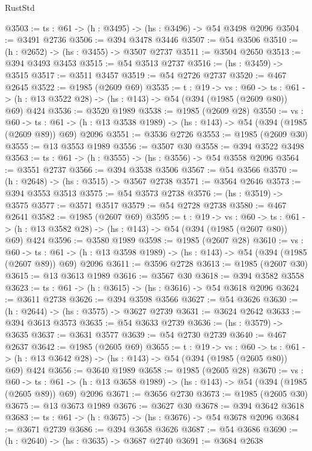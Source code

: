 \begin{lexlean}{RustStd}
\begin{coremodule}
@3503 := {ts : @61} -> (h : @3495) -> (hs : @3496) -> @54 @3498 @2096
@3504 := @3491 @2736
@3506 := @394 @3478 @3446
@3507 := @54 @3506
@3510 := (h : @2652) -> (hs : @3455) -> @3507 @2737
@3511 := @3504 @2650
@3513 := @394 @3493 @3453
@3515 := @54 @3513 @2737
@3516 := (hs : @3459) -> @3515
@3517 := @3511 @3457
@3519 := @54 @2726 @2737
@3520 := @467 @2645
@3522 := @1985 (@2609 @69)
@3535 := {t : @19} ->
  {vs : @60} ->
  {ts : @61} -> (h : @13 @3522 @28) -> (hs : @143) -> @54 (@394 (@1985 (@2609 @80)) @69) @424
@3536 := @3520 @1989
@3538 := @1985 (@2609 @28)
@3550 := {vs : @60} ->
  {ts : @61} -> (h : @13 @3538 @1989) -> (hs : @143) -> @54 (@394 (@1985 (@2609 @89)) @69) @2096
@3551 := @3536 @2726
@3553 := @1985 (@2609 @30)
@3555 := @13 @3553 @1989
@3556 := @3507 @30
@3558 := @394 @3522 @3498
@3563 := {ts : @61} -> (h : @3555) -> (hs : @3556) -> @54 @3558 @2096
@3564 := @3551 @2737
@3566 := @394 @3538 @3506
@3567 := @54 @3566
@3570 := (h : @2648) -> (hs : @3515) -> @3567 @2738
@3571 := @3564 @2646
@3573 := @394 @3553 @3513
@3575 := @54 @3573 @2738
@3576 := (hs : @3519) -> @3575
@3577 := @3571 @3517
@3579 := @54 @2728 @2738
@3580 := @467 @2641
@3582 := @1985 (@2607 @69)
@3595 := {t : @19} ->
  {vs : @60} ->
  {ts : @61} -> (h : @13 @3582 @28) -> (hs : @143) -> @54 (@394 (@1985 (@2607 @80)) @69) @424
@3596 := @3580 @1989
@3598 := @1985 (@2607 @28)
@3610 := {vs : @60} ->
  {ts : @61} -> (h : @13 @3598 @1989) -> (hs : @143) -> @54 (@394 (@1985 (@2607 @89)) @69) @2096
@3611 := @3596 @2728
@3613 := @1985 (@2607 @30)
@3615 := @13 @3613 @1989
@3616 := @3567 @30
@3618 := @394 @3582 @3558
@3623 := {ts : @61} -> (h : @3615) -> (hs : @3616) -> @54 @3618 @2096
@3624 := @3611 @2738
@3626 := @394 @3598 @3566
@3627 := @54 @3626
@3630 := (h : @2644) -> (hs : @3575) -> @3627 @2739
@3631 := @3624 @2642
@3633 := @394 @3613 @3573
@3635 := @54 @3633 @2739
@3636 := (hs : @3579) -> @3635
@3637 := @3631 @3577
@3639 := @54 @2730 @2739
@3640 := @467 @2637
@3642 := @1985 (@2605 @69)
@3655 := {t : @19} ->
  {vs : @60} ->
  {ts : @61} -> (h : @13 @3642 @28) -> (hs : @143) -> @54 (@394 (@1985 (@2605 @80)) @69) @424
@3656 := @3640 @1989
@3658 := @1985 (@2605 @28)
@3670 := {vs : @60} ->
  {ts : @61} -> (h : @13 @3658 @1989) -> (hs : @143) -> @54 (@394 (@1985 (@2605 @89)) @69) @2096
@3671 := @3656 @2730
@3673 := @1985 (@2605 @30)
@3675 := @13 @3673 @1989
@3676 := @3627 @30
@3678 := @394 @3642 @3618
@3683 := {ts : @61} -> (h : @3675) -> (hs : @3676) -> @54 @3678 @2096
@3684 := @3671 @2739
@3686 := @394 @3658 @3626
@3687 := @54 @3686
@3690 := (h : @2640) -> (hs : @3635) -> @3687 @2740
@3691 := @3684 @2638

\end{coremodule}
\end{lexlean}
